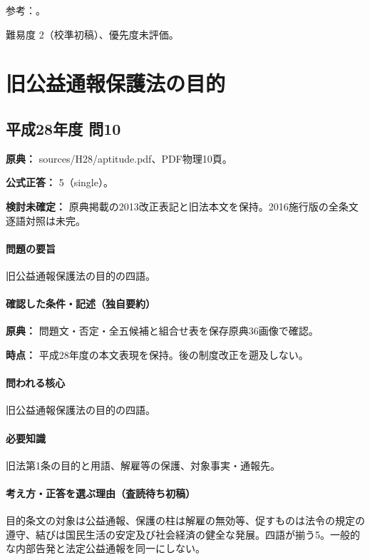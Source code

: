\par 参考：\cite{eth54_pdca2017}。

\par 難易度 2（校準初稿）、優先度未評価。

\section{旧公益通報保護法の目的}

\subsection{平成28年度 問10}
\label{q:h28-reg-apt-10}

\noindent\textbf{原典：} sources/H28/aptitude.pdf、PDF物理10頁。

\textbf{公式正答：} 5（single）。

\par\textbf{検討未確定：} 原典掲載の2013改正表記と旧法本文を保持。2016施行版の全条文逐語対照は未完。

\paragraph{問題の要旨} 旧公益通報保護法の目的の四語。

\paragraph{確認した条件・記述（独自要約）}\mbox{}\par

\noindent\textbf{原典：} 問題文・否定・全五候補と組合せ表を保存原典36画像で確認。\par

\noindent\textbf{時点：} 平成28年度の本文表現を保持。後の制度改正を遡及しない。\par

\paragraph{問われる核心} 旧公益通報保護法の目的の四語。

\paragraph{必要知識} 旧法第1条の目的と用語、解雇等の保護、対象事実・通報先。

\paragraph{考え方・正答を選ぶ理由（査読待ち初稿）} 目的条文の対象は公益通報、保護の柱は解雇の無効等、促すものは法令の規定の遵守、結びは国民生活の安定及び社会経済の健全な発展。四語が揃う5。一般的な内部告発と法定公益通報を同一にしない。

